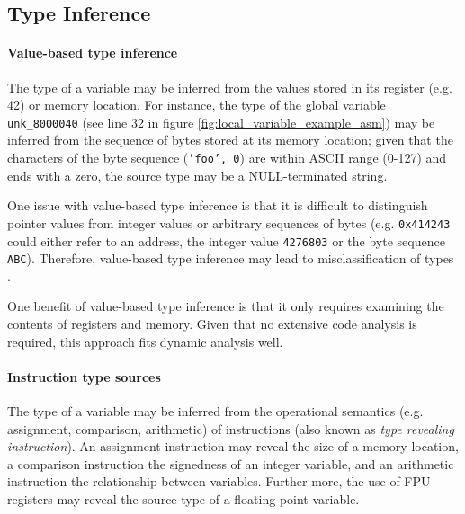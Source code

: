 
\subsection{Type Inference}


\paragraph{Value-based type inference}

The type of a variable may be inferred from the values stored in its register (e.g. 42) or memory location. For instance, the type of the global variable \texttt{unk\_8000040} (see line 32 in figure \ref{fig:local_variable_example_asm}) may be inferred from the sequence of bytes stored at its memory location; given that the characters of the byte sequence (\texttt{'foo', 0}) are within ASCII range (0-127) and ends with a zero, the source type may be a NULL-terminated string.

One issue with value-based type inference is that it is difficult to distinguish pointer values from integer values or arbitrary sequences of bytes (e.g. \texttt{0x414243} could either refer to an address, the integer value \texttt{4276803} or the byte sequence \texttt{ABC}). Therefore, value-based type inference may lead to misclassification of types \cite{type_inference_on_executables}.

One benefit of value-based type inference is that it only requires examining the contents of registers and memory. Given that no extensive code analysis is required, this approach fits dynamic analysis well.


\paragraph{Instruction type sources}

The type of a variable may be inferred from the operational semantics (e.g. assignment, comparison, arithmetic) of instructions (also known as \textit{type revealing instruction}). An assignment instruction may reveal the size of a memory location, a comparison instruction the signedness of an integer variable, and an arithmetic instruction the relationship between variables. Further more, the use of FPU registers may reveal the source type of a floating-point variable.

